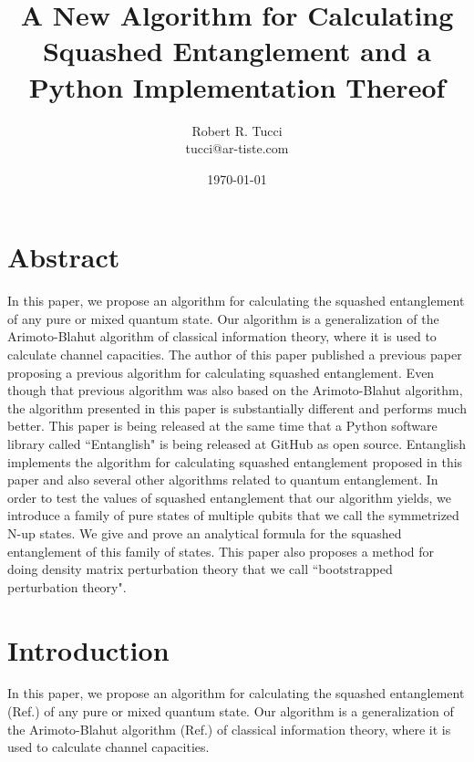 \documentclass[12pt]{article}%
\begin{document}
\title{A New  Algorithm for Calculating\\
Squashed Entanglement and a \\Python Implementation Thereof}


\author{Robert R. Tucci\\
        tucci@ar-tiste.com}


\date{ \today}

\maketitle

\vskip2cm
\section*{Abstract}
In this paper, we propose an algorithm
for calculating the squashed entanglement
of
any pure or mixed quantum state.
Our algorithm is a generalization
of the Arimoto-Blahut algorithm
 of classical
information theory,
where it is used to calculate channel capacities.
The author of this paper
published
a previous paper proposing a previous algorithm
for calculating squashed entanglement.
Even though that previous algorithm was
also based on the Arimoto-Blahut algorithm, the
algorithm presented in this paper is
substantially different and performs much better.
This paper is being released at the same time that
a Python software library called ``Entanglish"
is being released at GitHub as open source.
Entanglish implements the algorithm for
calculating squashed entanglement proposed
in this paper and also several other algorithms related
to quantum entanglement.
In order to test
the values of squashed
entanglement that our algorithm
yields, we introduce
a family of pure states of multiple qubits
that we call the symmetrized N-up states.
We give and prove an analytical formula
for the squashed entanglement of this
family of states.
This paper also proposes a method for doing density matrix perturbation theory that we call
  ``bootstrapped perturbation theory".








\newpage
\section{Introduction}

In this paper, we propose an algorithm
for calculating the squashed entanglement
(Ref.\cite{sq-wiki}) of
any pure or mixed quantum state.
Our algorithm is a generalization
of the Arimoto-Blahut algorithm (Ref.\cite{ab-algo})
 of classical
information theory,
where it is used to calculate channel capacities.
\end{document}

